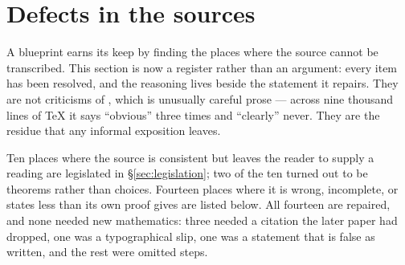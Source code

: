 \section{Defects in the sources}\label{sec:defects}

A blueprint earns its keep by finding the places where the source cannot be
transcribed. This section is now a register rather than an argument: every item
has been resolved, and the reasoning lives beside the statement it repairs.
They are not criticisms of \cite{ZhukSimplified}, which is unusually careful
prose --- across nine thousand lines of \TeX{} it says ``obvious'' three times
and ``clearly'' never. They are the residue that any informal exposition
leaves.

Ten places where the source is consistent but leaves the reader to supply a
reading are legislated in \S\ref{sec:legislation}; two of the ten turned out to
be theorems rather than choices. Fourteen places where it is wrong, incomplete,
or states less than its own proof gives are listed below. All fourteen are
repaired, and none needed new mathematics: three needed a citation the later
paper had dropped, one was a typographical slip, one was a statement that is
false as written, and the rest were omitted steps.

